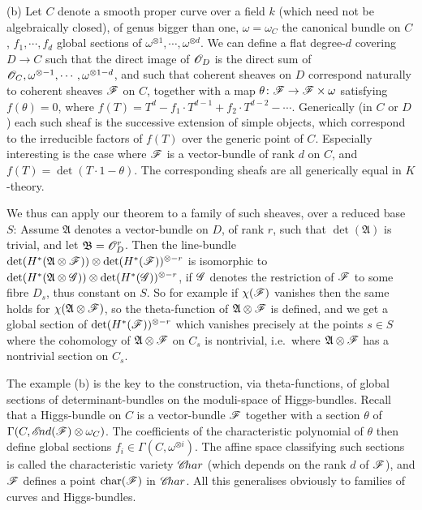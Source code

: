 \documentclass[12pt,english]{smfart}
\newcommand{\Ab}{\mathfrak{A}} \newcommand{\Bb}{\mathfrak{B}} \newcommand{\FA}{\mathfrak{A}} \newcommand{\FB}{\mathfrak{B}} \newcommand{\g}{\mathfrak{g}} \newcommand{\n}{\mathfrak{n}} \newcommand{\h}{\mathfrak{h}} \newcommand{\hh}{\mathfrak{h}} \newcommand{\p}{\mathfrak{p}} \newcommand{\ttt}{\mathfrak{t}} \newcommand{\zz}{\mathfrak{z}} \newcommand{\slt}{\mathfrak{sl}_2} \newcommand{\sltwo}{\mathfrak{sl}_2}
\theoremstyle{plain} \newtheorem{innerthm}{Theorem} \newtheorem{innerlem}{Lemma} \newtheorem{innerprop}{Proposition} \newtheorem{innercor}{Corollary} \theoremstyle{definition} \newtheorem{innerdefn}{Definition} \newtheorem{innerconstr}{Construction} \theoremstyle{remark} \newtheorem*{remark}{Remark} \newtheorem*{remarks}{Remarks} \newtheorem*{applications}{Applications}
\begin{document}
\medskip
{}
(b) Let $C$ denote a smooth proper curve over a field $k$ (which need not be algebraically closed), of genus bigger than one, $\omega=\omega_C$ the canonical bundle on $C$, $f_1,\cdots,f_d$ global sections of $\omega^{\otimes1},\cdots,\omega^{\otimes d}$. We can define a flat degree-$d$ covering $D\to C$ such that the direct image of $\mathscr{O}_D$ is the direct sum of $\mathscr{O}_C,\omega^{\otimes-1},\cdots,\omega^{\otimes1-d}$, and such that coherent sheaves on $D$ correspond naturally to coherent sheaves $\mathscr{F}$ on $C$, together with a map $\theta\colon\mathscr{F}\to\mathscr{F}\times\omega$ satisfying $f(\theta)=0$, where $f(T)=T^d-f_1\cdot T^{d-1}+f_2\cdot T^{d-2}-\cdots$. Generically (in $C$ or $D$) each such sheaf is the successive extension of simple objects, which correspond to the irreducible factors of $f(T)$ over the generic point of $C$. Especially interesting is the case where $\mathscr{F}$ is a vector-bundle of rank $d$ on $C$, and $f(T)=\det(T\cdot 1-\theta)$. The corresponding sheafs are all generically equal in $K$-theory.

We thus can apply our theorem to a family of such sheaves, over a reduced base $S$: Assume $\Ab$ denotes a vector-bundle on $D$, of rank $r$, such that $\det(\Ab)$ is trivial, and let $\Bb=\sO_D^r$. Then the line-bundle $\det(H^*(\Ab\otimes\sF))\otimes\det(H^*(\sF))^{\otimes-r}$ is isomorphic to $\det(H^*(\Ab\otimes\sG))\otimes\det(H^*(\sG))^{\otimes-r}$, if $\mathscr{G}$ denotes the restriction of $\mathscr{F}$ to some fibre $D_s$, thus constant on $S$. So for example if $\chi(\mathscr{F})$ vanishes then the same holds for $\chi(\Ab\otimes\sF)$, so the theta-function of $\Ab\otimes\sF$ is defined, and we get a global section of $\det(H^*(\mathscr{F}))^{\otimes-r}$ which vanishes precisely at the points $s\in S$ where the cohomology of $\Ab\otimes\sF$ on $C_s$ is nontrivial, i.e.\ where $\Ab\otimes\sF$ has a nontrivial section on $C_s$.

The example (b) is the key to the construction, via theta-functions, of global sections of determinant-bundles on the moduli-space of Higgs-bundles. Recall that a Higgs-bundle on $C$ is a vector-bundle $\mathscr{F}$ together with a section $\theta$ of $\Gamma(C,\mathscr{E}\!nd(\mathscr{F})\otimes\omega_C)$. The coefficients of the characteristic polynomial of $\theta$ then define global sections $f_i\in\Gamma(C,\omega^{\otimes i})$. The affine space classifying such sections is called the characteristic variety $\mathscr{C}\!har$ (which depends on the rank $d$ of $\mathscr{F}$), and $\mathscr{F}$ defines a point $\operatorname{char}(\mathscr{F})$ in $\mathscr{C}\!har$. All this generalises obviously to families of curves and Higgs-bundles.
\end{document}
